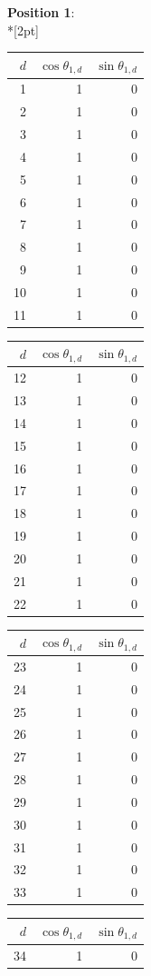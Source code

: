 \noindent \textbf{Position 1}:\\*[2pt]
{\tablefont \begin{tabular}[t]{r|rr}
$d$ & $\cos\theta_{1,d}$ & $\sin\theta_{1,d}$ \\\hline
1 & 1 & 0 \\
2 & 1 & 0 \\
3 & 1 & 0 \\
4 & 1 & 0 \\
5 & 1 & 0 \\
6 & 1 & 0 \\
7 & 1 & 0 \\
8 & 1 & 0 \\
9 & 1 & 0 \\
10 & 1 & 0 \\
11 & 1 & 0
\end{tabular}\kern4pt
\begin{tabular}[t]{r|rr}
$d$ & $\cos\theta_{1,d}$ & $\sin\theta_{1,d}$ \\\hline
12 & 1 & 0 \\
13 & 1 & 0 \\
14 & 1 & 0 \\
15 & 1 & 0 \\
16 & 1 & 0 \\
17 & 1 & 0 \\
18 & 1 & 0 \\
19 & 1 & 0 \\
20 & 1 & 0 \\
21 & 1 & 0 \\
22 & 1 & 0
\end{tabular}\kern4pt
\begin{tabular}[t]{r|rr}
$d$ & $\cos\theta_{1,d}$ & $\sin\theta_{1,d}$ \\\hline
23 & 1 & 0 \\
24 & 1 & 0 \\
25 & 1 & 0 \\
26 & 1 & 0 \\
27 & 1 & 0 \\
28 & 1 & 0 \\
29 & 1 & 0 \\
30 & 1 & 0 \\
31 & 1 & 0 \\
32 & 1 & 0 \\
33 & 1 & 0
\end{tabular}\kern4pt
\begin{tabular}[t]{r|rr}
$d$ & $\cos\theta_{1,d}$ & $\sin\theta_{1,d}$ \\\hline
34 & 1 & 0 \\

\end{tabular}}
